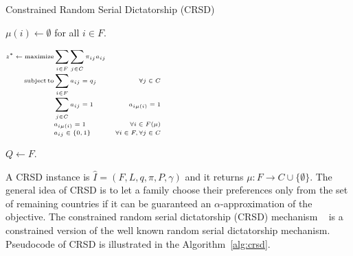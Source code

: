 \begin{algorithm}
    \caption{Constrained Random Serial Dictatorship (CRSD)}\label{alg:crsd}
    \KwResult{\(\mu\)}
    \(\mu ( i ) \leftarrow \emptyset\) for all \(i \in F\).

    \(\tiny
        \begin{aligned}
            z^* \leftarrow \operatorname{maximize} & \sum_{i \in F} \sum_{j \in C} \pi_{i j} a_{i j} \\[-1mm]
            \operatorname {subject}\operatorname{to} & \sum_{i \in F} a_{i j}=q_{j} & \forall j \in C \\[-1mm]
            & \sum_{j \in C} a_{i j}=1 & a_{i \mu(i)}=1 \\[-1mm]
            & a_{i\mu (i)} = 1 &  \forall i \in F(\mu) \\[-1mm]
            & a_{i j} \in\{0,1\} & \forall i \in F, \forall j \in C
        \end{aligned}
    \)%

    \(Q \leftarrow F\).

\end{algorithm}

A CRSD instance is \(\hat {I} = (F, L, q, \pi, P, \gamma)\) and it returns \(\mu : F \rightarrow C \cup \{\emptyset\}\).
The general idea of CRSD is to let a family choose their preferences only from the set of remaining countries if it can be guaranteed an \(\alpha\)-approximation of the objective.
The constrained random serial dictatorship (CRSD) mechanism ~\cite{bansak_2018} is a constrained version of the well known random serial dictatorship mechanism.
Pseudocode of CRSD is illustrated in the Algorithm~\ref{alg:crsd}.

